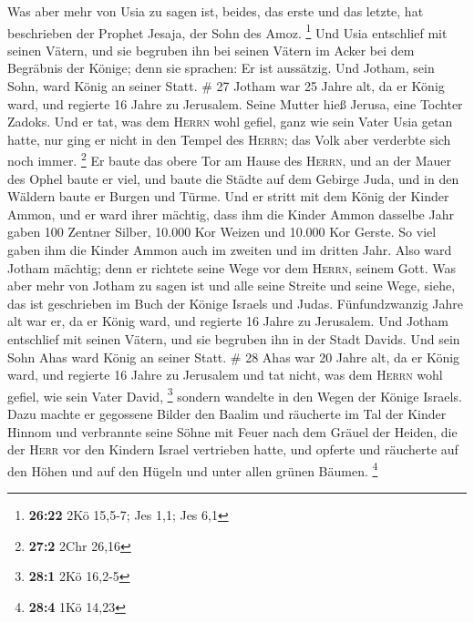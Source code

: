  Was aber mehr von Usia zu sagen ist, beides, das erste
und das letzte, hat beschrieben der Prophet Jesaja, der Sohn des Amoz.
\footnote{\textbf{26:22} 2Kö 15,5-7; Jes 1,1; Jes 6,1} 
Und Usia entschlief mit seinen Vätern, und sie begruben ihn bei seinen
Vätern im Acker bei dem Begräbnis der Könige; denn sie sprachen: Er ist
aussätzig. Und Jotham, sein Sohn, ward König an seiner Statt. \# 27
 Jotham war 25 Jahre alt, da er König ward, und regierte
16 Jahre zu Jerusalem. Seine Mutter hieß Jerusa, eine Tochter Zadoks.
 Und er tat, was dem \textsc{Herrn} wohl gefiel, ganz wie
sein Vater Usia getan hatte, nur ging er nicht in den Tempel des
\textsc{Herrn}; das Volk aber verderbte sich noch immer. \footnote{\textbf{27:2}
  2Chr 26,16}  Er baute das obere Tor am Hause des
\textsc{Herrn}, und an der Mauer des Ophel baute er viel, 
und baute die Städte auf dem Gebirge Juda, und in den Wäldern baute er
Burgen und Türme.  Und er stritt mit dem König der Kinder
Ammon, und er ward ihrer mächtig, dass ihm die Kinder Ammon dasselbe
Jahr gaben 100 Zentner Silber, 10.000 Kor Weizen und 10.000 Kor Gerste.
So viel gaben ihm die Kinder Ammon auch im zweiten und im dritten Jahr.
 Also ward Jotham mächtig; denn er richtete seine Wege vor
dem \textsc{Herrn}, seinem Gott.  Was aber mehr von Jotham
zu sagen ist und alle seine Streite und seine Wege, siehe, das ist
geschrieben im Buch der Könige Israels und Judas. 
Fünfundzwanzig Jahre alt war er, da er König ward, und regierte 16 Jahre
zu Jerusalem.  Und Jotham entschlief mit seinen Vätern,
und sie begruben ihn in der Stadt Davids. Und sein Sohn Ahas ward König
an seiner Statt. \# 28  Ahas war 20 Jahre alt, da er König
ward, und regierte 16 Jahre zu Jerusalem und tat nicht, was dem
\textsc{Herrn} wohl gefiel, wie sein Vater David, \footnote{\textbf{28:1}
  2Kö 16,2-5}  sondern wandelte in den Wegen der Könige
Israels. Dazu machte er gegossene Bilder den Baalim  und
räucherte im Tal der Kinder Hinnom und verbrannte seine Söhne mit Feuer
nach dem Gräuel der Heiden, die der \textsc{Herr} vor den Kindern Israel
vertrieben hatte,  und opferte und räucherte auf den Höhen
und auf den Hügeln und unter allen grünen Bäumen. \footnote{\textbf{28:4}
  1Kö 14,23}

